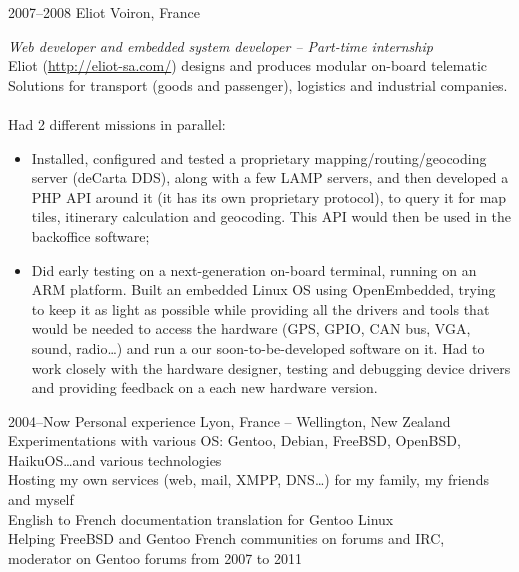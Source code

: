 \documentclass[]{friggeri-cv} %
\begin{document}
\begin{entrylist}
\entry
{2007--2008}
{Eliot}
{Voiron, France}
{\emph{Web developer and embedded system developer -- Part-time internship} \\
Eliot (\url{http://eliot-sa.com/}) designs and produces modular on-board
telematic Solutions for transport (goods and passenger), logistics and
industrial companies. \\
\\
Had 2 different missions in parallel:
\begin{itemize}
    \item Installed, configured and tested a proprietary
        mapping/routing/geocoding server (deCarta DDS), along with a few LAMP
        servers, and then developed a PHP API around it (it has its own
        proprietary protocol), to query it for map tiles, itinerary calculation
        and geocoding. This API would then be used in the backoffice software;
    \item Did early testing on a next-generation on-board terminal, running on
        an ARM platform. Built an embedded Linux OS using OpenEmbedded, trying
        to keep it as light as possible while providing all the drivers and
        tools that would be needed to access the hardware (GPS, GPIO, CAN bus,
        VGA, sound, radio\dots) and run a our soon-to-be-developed software on
        it. Had to work closely with the hardware designer, testing and
        debugging device drivers and providing feedback on a each new hardware
        version.
\end{itemize}}

\entry
{2004--Now}
{Personal experience}
{Lyon, France -- Wellington, New Zealand}
{Experimentations with various OS: Gentoo, Debian, FreeBSD, OpenBSD,
HaikuOS\dots and various technologies \\
Hosting my own services (web, mail, XMPP, DNS\dots) for my family, my friends
and myself \\
English to French documentation translation for Gentoo Linux \\
Helping FreeBSD and Gentoo French communities on forums and IRC, moderator on
Gentoo forums from 2007 to 2011}
\end{entrylist}

\end{document}

